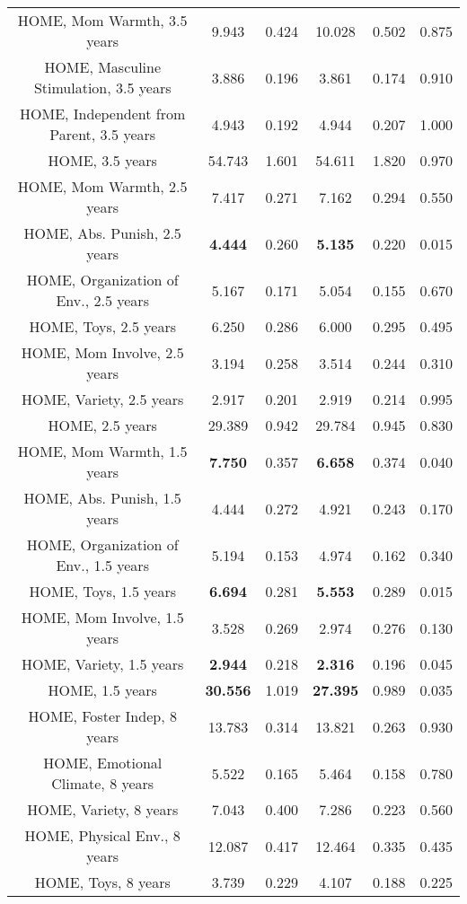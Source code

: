 \begin{tabular}{c c c c c c}
HOME, Mom Warmth, 3.5 years & 9.943 & 0.424 &  10.028 & 0.502 & 0.875 \\
HOME, Masculine Stimulation, 3.5 years & 3.886 & 0.196 &  3.861 & 0.174 & 0.910 \\
HOME, Independent from Parent, 3.5 years & 4.943 & 0.192 &  4.944 & 0.207 & 1.000 \\
HOME, 3.5 years & 54.743 & 1.601 &  54.611 & 1.820 & 0.970 \\
HOME, Mom Warmth, 2.5 years & 7.417 & 0.271 &  7.162 & 0.294 & 0.550 \\
HOME, Abs. Punish, 2.5 years & \textbf{4.444} & 0.260 &  \textbf{5.135} & 0.220 & 0.015 \\
HOME, Organization of Env., 2.5 years & 5.167 & 0.171 &  5.054 & 0.155 & 0.670 \\
HOME, Toys, 2.5 years & 6.250 & 0.286 &  6.000 & 0.295 & 0.495 \\
HOME, Mom Involve, 2.5 years & 3.194 & 0.258 &  3.514 & 0.244 & 0.310 \\
HOME, Variety, 2.5 years & 2.917 & 0.201 &  2.919 & 0.214 & 0.995 \\
HOME, 2.5 years & 29.389 & 0.942 &  29.784 & 0.945 & 0.830 \\
HOME, Mom Warmth, 1.5 years & \textbf{7.750} & 0.357 &  \textbf{6.658} & 0.374 & 0.040 \\
HOME, Abs. Punish, 1.5 years & 4.444 & 0.272 &  4.921 & 0.243 & 0.170 \\
HOME, Organization of Env., 1.5 years & 5.194 & 0.153 &  4.974 & 0.162 & 0.340 \\
HOME, Toys, 1.5 years & \textbf{6.694} & 0.281 &  \textbf{5.553} & 0.289 & 0.015 \\
HOME, Mom Involve, 1.5 years & 3.528 & 0.269 &  2.974 & 0.276 & 0.130 \\
HOME, Variety, 1.5 years & \textbf{2.944} & 0.218 &  \textbf{2.316} & 0.196 & 0.045 \\
HOME, 1.5 years & \textbf{30.556} & 1.019 &  \textbf{27.395} & 0.989 & 0.035 \\
HOME, Foster Indep, 8 years & 13.783 & 0.314 &  13.821 & 0.263 & 0.930 \\
HOME, Emotional Climate, 8 years & 5.522 & 0.165 &  5.464 & 0.158 & 0.780 \\
HOME, Variety, 8 years & 7.043 & 0.400 &  7.286 & 0.223 & 0.560 \\
HOME, Physical Env., 8 years & 12.087 & 0.417 &  12.464 & 0.335 & 0.435 \\
HOME, Toys, 8 years & 3.739 & 0.229 &  4.107 & 0.188 & 0.225 \\

\end{tabular}
